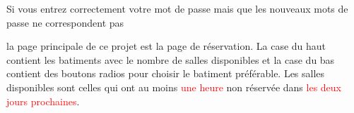 \documentclass{article}
\begin{document}
\begin{enumerate}
  
  
  Si vous entrez correctement votre mot de passe mais que les nouveaux mots de passe ne correspondent pas
  \vspace{0.7cm}
   
\hspace*{-0.7in}

               \noindent{}  
               
  
  la page principale de ce projet est la page de réservation. La case du haut contient les batiments avec le nombre de salles disponibles et la case du bas contient des boutons radios  pour choisir le batiment préférable. Les salles disponibles sont celles qui ont au moins \textcolor{red}{une heure} non réservée dans \textcolor{red}{les deux jours prochaines}.
  
  \vspace{0.7cm}
   
\hspace*{-0.7in}
               \noindent{}  
  

\end{enumerate}
\end{document}
